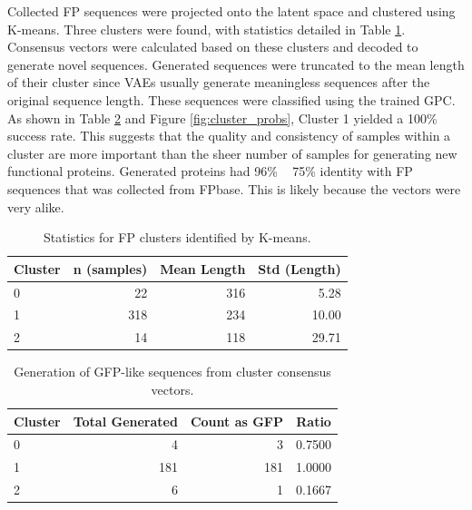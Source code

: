 \documentclass[numsec,webpdf,contemporary,medium]{oup-authoring-template}
\begin{document}
Collected FP sequences were projected onto the latent space and clustered using K-means. Three clusters were found, with statistics detailed in Table \ref{tab:cluster_stats}. Consensus vectors were calculated based on these clusters and decoded to generate novel sequences. Generated sequences were truncated to the mean length of their cluster since VAEs usually generate meaningless sequences after the original sequence length. These sequences were classified using the trained GPC. As shown in Table \ref{tab:gfp_generation} and Figure \ref{fig:cluster_probs}, Cluster 1 yielded a 100\% success rate. This suggests that the quality and consistency of samples within a cluster are more important than the sheer number of samples for generating new functional proteins. Generated proteins had 96\% ~ 75\% identity with FP sequences that was collected from FPbase. This is likely because the vectors were very alike.

\begin{table}[!ht]
\caption{Statistics for FP clusters identified by K-means.}\label{tab:cluster_stats}
\centering
\begin{tabular}{@{}lrrr@{}}
\toprule
\textbf{Cluster} & \textbf{n (samples)} & \textbf{Mean Length} & \textbf{Std (Length)} \\
\midrule
0 & 22 & 316 & 5.28 \\
1 & 318 & 234 & 10.00 \\
2 & 14 & 118 & 29.71 \\
\bottomrule
\end{tabular}
\end{table}

\begin{table}[!ht]
\caption{Generation of GFP-like sequences from cluster consensus vectors.}\label{tab:gfp_generation}
\centering
\begin{tabular}{@{}lrrr@{}}
\toprule
\textbf{Cluster} & \textbf{Total Generated} & \textbf{Count as GFP} & \textbf{Ratio} \\
\midrule
0 & 4 & 3 & 0.7500 \\
1 & 181 & 181 & 1.0000 \\
2 & 6 & 1 & 0.1667 \\
\bottomrule
\end{tabular}
\end{table}
\end{document}
